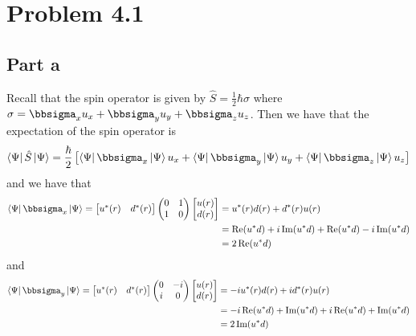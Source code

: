 \documentclass[12pt]{report}
\theoremstyle{custom}
\begin{document}
\maketitle


\section*{Problem 4.1}
\subsection*{Part a}
Recall that the spin operator is given by $\hat{S} = \frac{1}{2} \hbar \sigma$ where $\sigma = \bbsigma_x u_x + \bbsigma_y u_y + \bbsigma_z u_z$. Then we have that the expectation of the spin operator is
\begin{align*}
  \bra{\Psi}\hat{S} \ket{\Psi} = \frac{\hbar}{2}\left[\bra{\Psi}\bbsigma_x\ket{\Psi} u_x +\bra{\Psi}\bbsigma_y\ket{\Psi}u_y + \bra{\Psi}\bbsigma_z\ket{\Psi} u_z  \right]
\end{align*}
and we have that
\begin{align*}
  \bra{\Psi} \bbsigma_x \ket{\Psi} = \begin{bmatrix}u^*(r) &  d^*(r)\end{bmatrix} \begin{pmatrix}0 & 1 \\ 1 & 0 \end{pmatrix} \begin{bmatrix} u(r) \\ d(r) \end{bmatrix} &= u^*(r)d(r) + d^*(r)u(r) \\
                                                           &= \Re(u^*d) + i\Im(u^*d) + \Re(u^*d) - i\Im(u^*d) \\
                                                                      &= 2 \Re(u^*d)
\end{align*}
and
\begin{align*}
  \bra{\Psi} \bbsigma_y \ket{\Psi} = \begin{bmatrix}u^*(r) &  d^*(r)\end{bmatrix}\begin{pmatrix}0 & -i \\ i & 0 \end{pmatrix} \begin{bmatrix} u(r) \\ d(r) \end{bmatrix} &= -iu^*(r)d(r) + i d^*(r)u(r) \\ 
                                                           &= -i\Re(u^*d) + \Im(u^*d) + i \Re(u^*d) + \Im(u^*d) \\
                                                           &= 2 \Im(u^*d) 
\end{align*}
\end{document}
